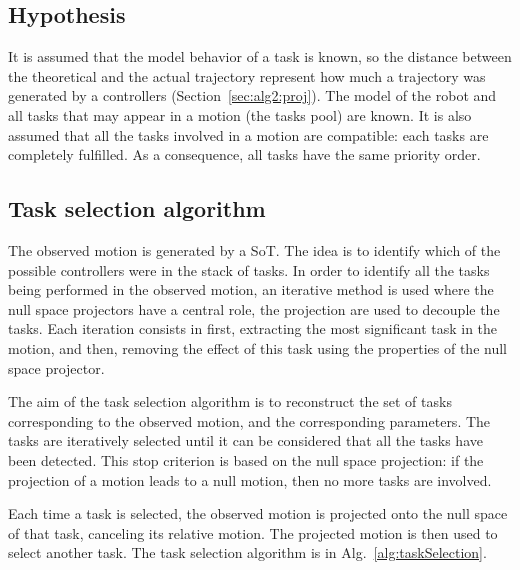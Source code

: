 \documentclass[letterpaper, 10pt, conference]{ieeeconf}      %
\begin{document}
\subsection{Hypothesis}
It is assumed that the model behavior of a task is known, so the distance between
the theoretical and the actual trajectory represent how much a trajectory
was generated by a controllers (Section~\ref{sec:alg2:proj}).
The model of the robot and all tasks that may appear in a motion (the tasks pool) are known.
It is also assumed that all the tasks involved in a motion are compatible:
each tasks are completely fulfilled. As a consequence, all
tasks have the same priority order. 

\subsection{Task selection algorithm} \label{sec:alg1:selec}
The observed motion is generated by a SoT.  The idea is to identify which of the possible controllers were in the stack of tasks. 
In order to identify all the
tasks being performed in the observed motion, an iterative method is used where
the null space projectors have a central role, the projection
are used to decouple the tasks.
Each iteration consists in first, extracting the most significant task in the motion,
and then, removing the effect of this task using the properties of the null space projector.

The aim of the task selection algorithm is to reconstruct the set of tasks corresponding
to the observed motion, and the corresponding parameters.
The tasks are iteratively selected until it can be considered that all the tasks
have been detected.
This stop criterion is based on the
null space projection: if the projection of a motion
leads to a null motion, then no more tasks are involved.

Each time a task is selected, the observed motion is projected
onto the null space of that task, canceling its relative motion. 
The projected motion is then used to select another task.
The task selection algorithm is in Alg.~\ref{alg:taskSelection}.

\newcommand{\shOUTPUT}{\textbf{Output: }}
\newcommand{\shINPUT}{\textbf{Input: }}
\end{document}
